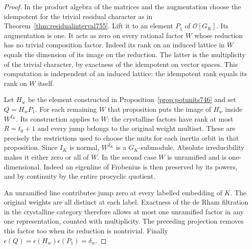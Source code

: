 \documentclass[a4paper,11pt]{article}
\theoremstyle{definition}
\theoremstyle{remark}
\numberwithin{equation}{section}
\begin{document}
\begin{proof}
In the product algebra of the matrices and the augmentation
choose the idempotent for the trivial residual character as
in Theorem~\ref{thm:residualinterval755}. Lift it to an element
\(P_1\) of \(\mathcal O[G_K]\). Its augmentation is one. It
acts as zero on every rational factor \(W\) whose reduction
has no trivial composition factor. Indeed its rank on an
induced lattice in \(W\) equals the dimension of its image
on the reduction. The latter is the multiplicity of the
trivial character, by exactness of the idempotent on vector
spaces. This computation is independent of an induced lattice:
the idempotent rank equals its rank on \(W\) itself.

Let \(H_w\) be the element constructed in
Proposition~\ref{prop:potunits746} and set \(Q=H_wP_1\).
For each remaining \(W\) that proposition puts the image of
\(H_w\) inside \(W^{I_K}\). Its construction applies to \(W\):
the crystalline factors have rank at most \(R=t_0+1\) and
every jump belongs to the original weight multiset. These
are precisely the restrictions used to choose the units for
each inertia orbit in that proposition. Since \(I_K\) is
normal, \(W^{I_K}\) is a \(G_K\)-submodule. Absolute
irreducibility makes it either zero or all of \(W\). In the
second case \(W\) is unramified and is one-dimensional.
Indeed an eigenline of Frobenius is then preserved by its
powers, and by continuity by the entire procyclic quotient.

An unramified line contributes jump zero at every labelled
embedding of \(K\). The original weights are all distinct
at each label. Exactness of the de Rham filtration in the
crystalline category therefore allows at most one unramified
factor in any one representation, counted with multiplicity.
The preceding projection removes this factor too when its
reduction is nontrivial. Finally
\(\epsilon(Q)=\epsilon(H_w)\epsilon(P_1)=\delta_w\).
\end{proof}
\end{document}

